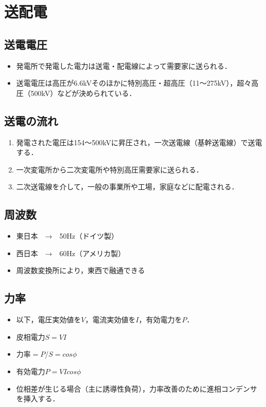 \section{送配電}
\subsection{送電電圧}
\begin{itemize}
  \item 発電所で発電した電力は送電・配電線によって需要家に送られる．
  \item 送電電圧は高圧が6.6kVそのほかに特別高圧・超高圧（11〜275kV），超々高圧（500kV）などが決められている．
\end{itemize}

\subsection{送電の流れ}
\begin{enumerate}
  \item 発電された電圧は154〜500kVに昇圧され，一次送電線（基幹送電線）で送電する．
  \item 一次変電所から二次変電所や特別高圧需要家に送られる．
  \item 二次送電線を介して，一般の事業所や工場，家庭などに配電される．
\end{enumerate}

\subsection{周波数}
\begin{itemize}
  \item 東日本　→　50Hz（ドイツ製）
  \item 西日本　→　60Hz（アメリカ製）
  \item 周波数変換所により，東西で融通できる
\end{itemize}

\subsection{力率}
\begin{itemize}
  \item 以下，電圧実効値を$V$，電流実効値を$I$，有効電力を$P$．
  \item 皮相電力$S=VI$
  \item 力率$=P$/$S$$=cos\phi$
  \item 有効電力$P=VIcos\phi$
  \item 位相差が生じる場合（主に誘導性負荷），力率改善のために進相コンデンサを挿入する．
\end{itemize}

